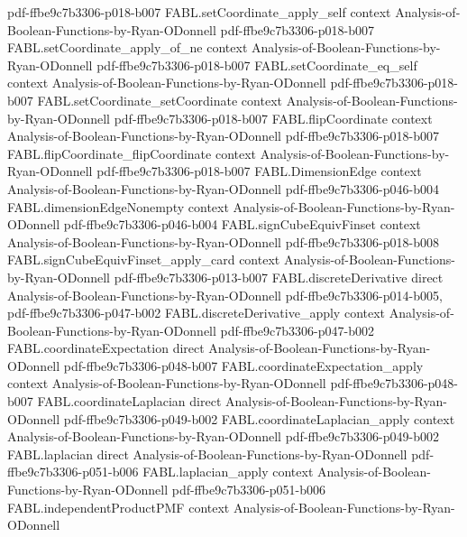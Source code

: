 \begin{theorem}
  {pdf-ffbe9c7b3306-p018-b007}
\proofstep
  {FABL.setCoordinate_apply_self}
  {context}
  {Analysis-of-Boolean-Functions-by-Ryan-ODonnell}
  {pdf-ffbe9c7b3306-p018-b007}
\proofstep
  {FABL.setCoordinate_apply_of_ne}
  {context}
  {Analysis-of-Boolean-Functions-by-Ryan-ODonnell}
  {pdf-ffbe9c7b3306-p018-b007}
\proofstep
  {FABL.setCoordinate_eq_self}
  {context}
  {Analysis-of-Boolean-Functions-by-Ryan-ODonnell}
  {pdf-ffbe9c7b3306-p018-b007}
\proofstep
  {FABL.setCoordinate_setCoordinate}
  {context}
  {Analysis-of-Boolean-Functions-by-Ryan-ODonnell}
  {pdf-ffbe9c7b3306-p018-b007}
\proofstep
  {FABL.flipCoordinate}
  {context}
  {Analysis-of-Boolean-Functions-by-Ryan-ODonnell}
  {pdf-ffbe9c7b3306-p018-b007}
\proofstep
  {FABL.flipCoordinate_flipCoordinate}
  {context}
  {Analysis-of-Boolean-Functions-by-Ryan-ODonnell}
  {pdf-ffbe9c7b3306-p018-b007}
\proofstep
  {FABL.DimensionEdge}
  {context}
  {Analysis-of-Boolean-Functions-by-Ryan-ODonnell}
  {pdf-ffbe9c7b3306-p046-b004}
\proofstep
  {FABL.dimensionEdgeNonempty}
  {context}
  {Analysis-of-Boolean-Functions-by-Ryan-ODonnell}
  {pdf-ffbe9c7b3306-p046-b004}
\proofstep
  {FABL.signCubeEquivFinset}
  {context}
  {Analysis-of-Boolean-Functions-by-Ryan-ODonnell}
  {pdf-ffbe9c7b3306-p018-b008}
\proofstep
  {FABL.signCubeEquivFinset_apply_card}
  {context}
  {Analysis-of-Boolean-Functions-by-Ryan-ODonnell}
  {pdf-ffbe9c7b3306-p013-b007}
\proofstep
  {FABL.discreteDerivative}
  {direct}
  {Analysis-of-Boolean-Functions-by-Ryan-ODonnell}
  {pdf-ffbe9c7b3306-p014-b005,
    pdf-ffbe9c7b3306-p047-b002}
\proofstep
  {FABL.discreteDerivative_apply}
  {context}
  {Analysis-of-Boolean-Functions-by-Ryan-ODonnell}
  {pdf-ffbe9c7b3306-p047-b002}
\proofstep
  {FABL.coordinateExpectation}
  {direct}
  {Analysis-of-Boolean-Functions-by-Ryan-ODonnell}
  {pdf-ffbe9c7b3306-p048-b007}
\proofstep
  {FABL.coordinateExpectation_apply}
  {context}
  {Analysis-of-Boolean-Functions-by-Ryan-ODonnell}
  {pdf-ffbe9c7b3306-p048-b007}
\proofstep
  {FABL.coordinateLaplacian}
  {direct}
  {Analysis-of-Boolean-Functions-by-Ryan-ODonnell}
  {pdf-ffbe9c7b3306-p049-b002}
\proofstep
  {FABL.coordinateLaplacian_apply}
  {context}
  {Analysis-of-Boolean-Functions-by-Ryan-ODonnell}
  {pdf-ffbe9c7b3306-p049-b002}
\proofstep
  {FABL.laplacian}
  {direct}
  {Analysis-of-Boolean-Functions-by-Ryan-ODonnell}
  {pdf-ffbe9c7b3306-p051-b006}
\proofstep
  {FABL.laplacian_apply}
  {context}
  {Analysis-of-Boolean-Functions-by-Ryan-ODonnell}
  {pdf-ffbe9c7b3306-p051-b006}
\proofstep
  {FABL.independentProductPMF}
  {context}
  {Analysis-of-Boolean-Functions-by-Ryan-ODonnell}

\end{theorem}
